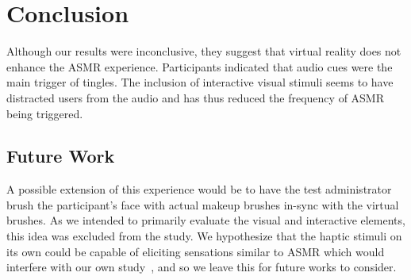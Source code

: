 \documentclass{sigchi}
\begin{document}
%
%
%

\section{Conclusion}
Although our results were inconclusive, they suggest that virtual reality does not enhance the ASMR experience. Participants indicated that audio cues were the main trigger of tingles. The inclusion of interactive visual stimuli seems to have distracted users from the audio and has thus reduced the frequency of ASMR being triggered.


\subsection{Future Work}

A possible extension of this experience would be to have the test administrator brush the participant's face with actual makeup brushes in-sync with the virtual brushes. As we intended to primarily evaluate the visual and interactive elements, this idea was excluded from the study. We hypothesize that the haptic stimuli on its own could be capable of eliciting sensations similar to ASMR which would interfere with our own study~\cite{hall1897psychology}, and so we leave this for future works to consider.


\end{document}

